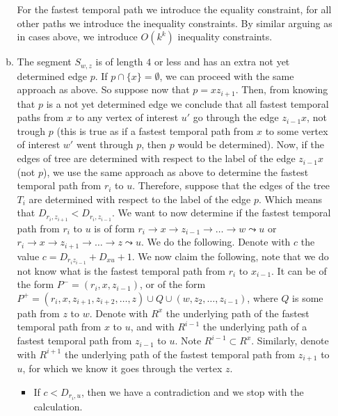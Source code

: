 \documentclass[a4paper,UKenglish,cleveref, autoref, thm-restate]{lipics-v2021}
\begin{document}
\begin{enumerate}[(i)]
\begin{enumerate}[(a)]
        For the fastest temporal path we introduce the equality constraint, 
        for all other paths we introduce the inequality constraints.
        By similar arguing as in cases above, we introduce $O(k^k)$ inequality constraints.
        \item The segment $S_{w,z}$ is of length $4$ or less
        and has an extra not yet determined edge $p$. 
        If $p \cap \{x\} = \emptyset$, 
        we can proceed with the same approach as above.
        So suppose now that $p = x z_{i+1}$.  
        Then, from knowing that $p$ is a not yet determined edge we conclude that
        all fastest temporal paths from $x$ to any vertex of interest $u'$ go through the edge $z_{i-1}x$, not trough $p$ 
        (this is true as if a fastest temporal path from $x$ to some vertex of interest $w'$ went through $p$, then $p$ would be determined).
        Now, if the edges of tree are determined with respect to the label of the edge $z_{i-1}x$ (not $p$),
        we use the same approach as above to determine the fastest temporal path from $r_i$ to $u$.
        Therefore, suppose that the edges of the tree $T_i$ are determined with respect to the label of the edge $p$.
        Which means that $D_{r_i, z_{i+1}} < D_{r_i, z_{i-1}}$.
        We want to now determine if the fastest temporal path from $r_i$ to $u$ is of form 
        $r_i \rightarrow x \rightarrow z_{i-1} \rightarrow \dots \rightarrow w \leadsto u$ or
        $r_i \rightarrow x \rightarrow z_{i+1} \rightarrow \dots \rightarrow z \leadsto u$.
        We do the following.
        Denote with $c$ the value $c = D_{r_i z_{i-1}} + D_{x u} + 1$.
        We now claim the following, note that we do not know what is the fastest temporal path from $r_i$ to $x_{i-1}$. 
        It can be of the form $P^- = (r_i,x,z_{i-1})$,
        or of the form $P^+ = (r_i,x, z_{i+1}, z_{i+2}, \dots, z) \cup Q \cup (w, z_2, \dots, z_{i-1})$, where $Q$ is some path from $z$ to $w$.
        Denote with $R^x$ the underlying path of the fastest temporal path from $x$ to $u$,
        and with $R^{i-1}$ the underlying path of a fastest temporal path from $z_{i-1}$ to $u$.
        Note $R^{i-1} \subset R^x$.
        Similarly,
        denote with $R^{i+1}$ the underlying path of the fastest temporal path from $z_{i+1}$ to $u$, 
        for which we know it goes through the vertex $z$.
        \begin{itemize}
            \item  If $c < D_{r_i,u}$, then we have a contradiction and we stop with the calculation.\\

\end{itemize}
\end{enumerate}
\end{enumerate}
\end{document}
